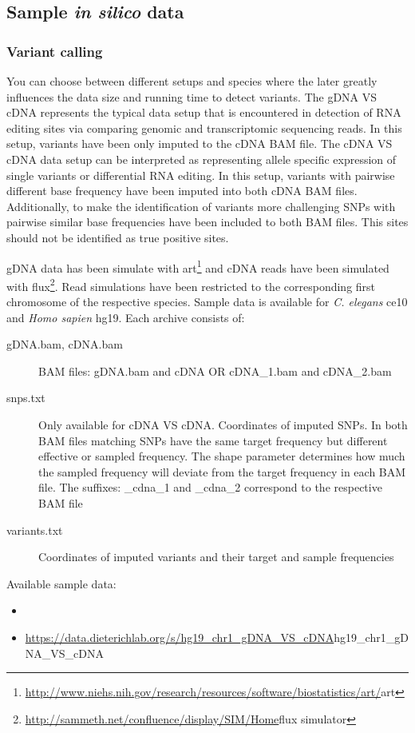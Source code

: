 \documentclass[10pt,a4paper,draft]{article}
\begin{document}
\subsection{Sample \textit{in silico} data}
\subsubsection{Variant calling}
You can choose between different setups and species where the later greatly influences the data size 
and running time to detect variants. The gDNA VS cDNA represents the typical data setup that is 
encountered in detection of RNA editing sites via comparing genomic and transcriptomic sequencing reads. 
In this setup, variants have been only imputed to the cDNA BAM file. The cDNA VS cDNA data setup can be interpreted as
representing allele specific expression of single variants or differential RNA editing. In this
setup, variants with pairwise different base frequency have been imputed into both cDNA BAM files.
Additionally, to make the identification of variants more challenging SNPs with pairwise similar base
frequencies have been included to both BAM files. This sites should not be identified as true
positive sites.

gDNA data has been simulate with
art\footnote{\url{http://www.niehs.nih.gov/research/resources/software/biostatistics/art/}{art}}
and cDNA reads have been simulated with
flux\footnote{\url{http://sammeth.net/confluence/display/SIM/Home}{flux simulator}}. Read
simulations have been restricted to the corresponding first chromosome of the respective species.
Sample data is available for \textit{C. elegans} ce10 and \textit{Homo sapien} hg19. Each archive
consists of:
\begin{description}
  \item[gDNA.bam, cDNA.bam] BAM files: gDNA.bam and cDNA OR cDNA\_1.bam and cDNA\_2.bam
  \item[snps.txt] Only available for cDNA VS cDNA. Coordinates of imputed SNPs. In both
  BAM files matching SNPs have the same target frequency but different effective or sampled
  frequency. The shape parameter determines how much the sampled frequency will deviate from the
  target frequency in each BAM file. The suffixes: \_cdna\_1 and \_cdna\_2 correspond to the
  respective BAM file
  \item[variants.txt] Coordinates of imputed variants and their target and sample
  frequencies
\end{description}
Available sample data:
\begin{itemize}
  \item
  \item \url{https://data.dieterichlab.org/s/hg19_chr1_gDNA_VS_cDNA}{hg19\_chr1\_gDNA\_VS\_cDNA}
\end{itemize}
\end{document}

